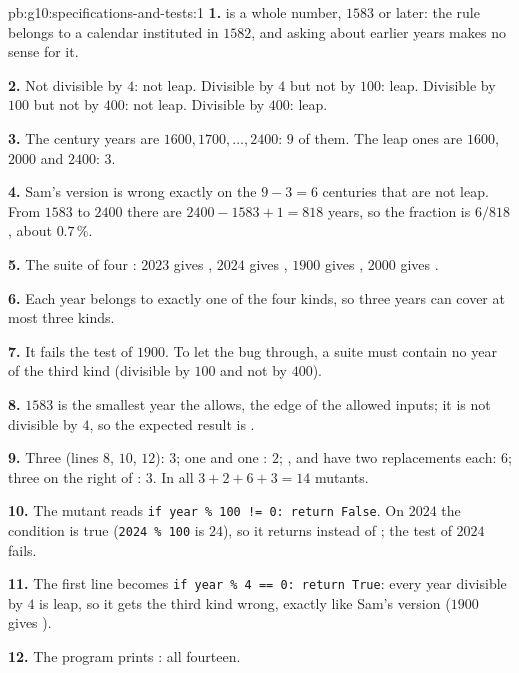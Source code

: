 \begin{solution}{pb:g10:specifications-and-tests:1}
\textbf{1.}  is a whole number, $1583$ or later: the rule belongs to a calendar instituted in $1582$, and
asking about earlier years makes no sense for it.

\textbf{2.} Not divisible by $4$: not leap. Divisible by $4$ but not by $100$: leap. Divisible by $100$ but not by
$400$: not leap. Divisible by $400$: leap.

\textbf{3.} The century years are $1600, 1700, \dots, 2400$: $9$ of them. The leap ones are $1600$, $2000$ and
$2400$: $3$.

\textbf{4.} Sam's version is wrong exactly on the $9 - 3 = 6$ centuries that are not leap. From $1583$ to $2400$
there are $2400 - 1583 + 1 = 818$ years, so the fraction is $6/818$, about $0.7\,\%$.

\textbf{5.} The suite of four : $2023$ gives , $2024$ gives , $1900$ gives
, $2000$ gives .

\textbf{6.} Each year belongs to exactly one of the four kinds, so three years can cover at most three kinds.

\textbf{7.} It fails the test of $1900$. To let the bug through, a suite must contain no year of the third kind
(divisible by $100$ and not by $400$).

\textbf{8.} $1583$ is the smallest year the  allows, the edge of the allowed inputs; it is not divisible
by $4$, so the expected result is .

\textbf{9.} Three \code{==} (lines $8$, $10$, $12$): $3$; one  and one : $2$; ,
 and  have two replacements each: $6$; three  on the right of \code{==}: $3$. In all
$3 + 2 + 6 + 3 = 14$ mutants.

\textbf{10.} The mutant reads \texttt{if year \% 100 != 0: return False}. On $2024$ the condition is true
(\texttt{2024 \% 100} is $24$), so it returns  instead of ; the test of $2024$ fails.

\textbf{11.} The first line becomes \texttt{if year \% 4 == 0: return True}: every year divisible by $4$ is leap, so it
gets the third kind wrong, exactly like Sam's version ($1900$ gives ).

\textbf{12.} The program prints : all fourteen.


\end{solution}
